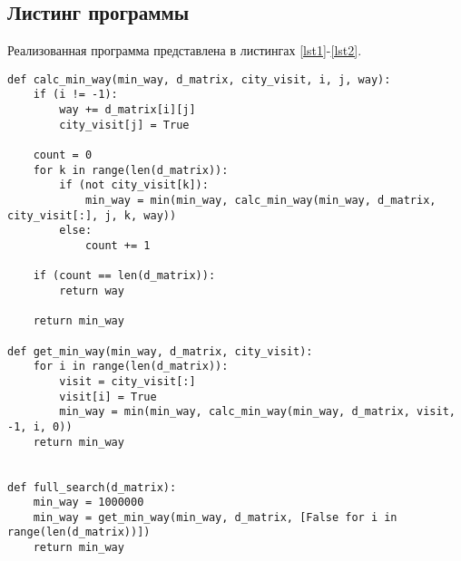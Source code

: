 \documentclass[a4paper,12pt]{article}
\begin{document}
\subsection{Листинг программы}

Реализованная программа представлена
в листингах \ref{lst1}-\ref{lst2}.

\begin{lstlisting}[label=lst1,caption=Реализация полного перебора для решения задачи коммивояжера]
def calc_min_way(min_way, d_matrix, city_visit, i, j, way):
	if (i != -1):
		way += d_matrix[i][j]
		city_visit[j] = True
	
	count = 0
	for k in range(len(d_matrix)):
		if (not city_visit[k]):
			min_way = min(min_way, calc_min_way(min_way, d_matrix, city_visit[:], j, k, way))
		else:
			count += 1
	
	if (count == len(d_matrix)):
		return way
	
	return min_way

def get_min_way(min_way, d_matrix, city_visit):
	for i in range(len(d_matrix)):
		visit = city_visit[:]
		visit[i] = True
		min_way = min(min_way, calc_min_way(min_way, d_matrix, visit, -1, i, 0))
	return min_way


def full_search(d_matrix):
	min_way = 1000000
	min_way = get_min_way(min_way, d_matrix, [False for i in range(len(d_matrix))])
	return min_way
\end{lstlisting}
\end{document}
